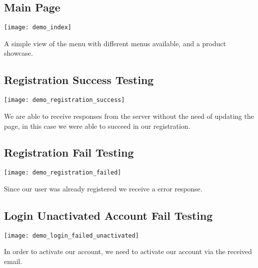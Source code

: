 \subsection[Main Page]{Main Page}\label{subsec:main-page}
\begin{center}
    \texttt{[image: demo\_index]}
\end{center}
\begin{flushleft}
    A simple view of the menu with different menus available, and a product showcase.
\end{flushleft}

\subsection[Registration Success Testing]{Registration Success Testing}\label{subsec:registration-success-testing}
\begin{center}
    \texttt{[image: demo\_registration\_success]}
\end{center}
\begin{flushleft}
    We are able to receive responses from the server without the need of updating the page, in this case we were able to succeed in our registration.
\end{flushleft}

\subsection[Registration Fail Testing]{Registration Fail Testing}\label{subsec:registration-fail-testing}
\begin{center}
    \texttt{[image: demo\_registration\_failed]}
\end{center}
\begin{flushleft}
    Since our user was already registered we receive a error response.
\end{flushleft}

\subsection[Login Unactivated Account Fail Testing]{Login Unactivated Account Fail Testing}\label{subsec:login-unactivated-account-fail-testing}
\begin{center}
    \texttt{[image: demo\_login\_failed\_unactivated]}
\end{center}
\begin{flushleft}
    In order to activate our account, we need to activate our account via the received email.
\end{flushleft}

